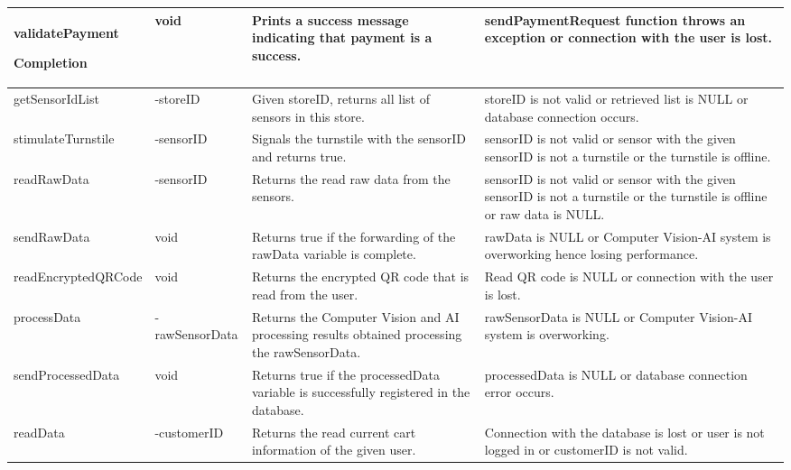 \documentclass[11pt]{article}
\begin{document}
\begin{longtable}[H]{|p{3.8cm}|p{3cm}|p{4cm}|p{4.5cm}|}
        validatePayment
       
        Completion 
        & void
        & Prints a success message indicating that payment is a success. 
        & sendPaymentRequest function throws an exception or connection with the user is lost.\\ \hline
       
        getSensorIdList 
        & -storeID
        & Given storeID, returns all list of sensors in this store.
        & storeID is not valid or retrieved list is NULL or database connection occurs.\\ \hline
       
        stimulateTurnstile 
        & -sensorID
        & Signals the turnstile with the sensorID and returns true.
        & sensorID is not valid or sensor with the given sensorID is not a turnstile or the turnstile is offline.\\ \hline
       
        readRawData 
        &-sensorID  
        & Returns the read raw data from the sensors.
        & sensorID is not valid or sensor with the given sensorID is not a turnstile or the turnstile is offline or raw data is NULL.\\ \hline
       
        sendRawData 
        & void
        & Returns true if the forwarding of the rawData variable is complete.
        & rawData is NULL or Computer Vision-AI system is overworking hence losing performance.\\ \hline
       
        readEncryptedQRCode 
        & void
        & Returns the encrypted QR code that is read from the user. 
        & Read QR code is NULL or connection with the user is lost.\\ \hline
       
        processData 
        & -rawSensorData
        & Returns the Computer Vision and AI processing results obtained processing the rawSensorData.
        & rawSensorData is NULL or Computer Vision-AI system is overworking.\\ \hline    
       
        sendProcessedData 
        & void
        & Returns true if the processedData variable is successfully registered in the database.
        & processedData is NULL or database connection error occurs.\\ \hline
       
        readData 
        & -customerID
        & Returns the read current cart information of the given user.
        & Connection with the database is lost or user is not logged in or customerID is not valid.\\ \hline
       

\end{longtable}
\end{document}
